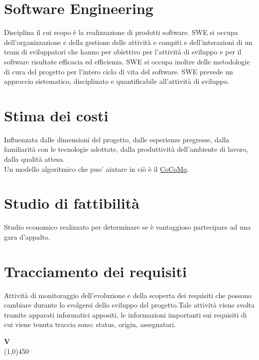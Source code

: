 	\section{Software Engineering}
	\label{sec:swe}
	Disciplina il cui scopo è la realizzazione di prodotti software.
	SWE si occupa dell'organizzazione e della gestione delle attività e compiti e dell'interazioni di un team di sviluppatori
	che hanno per obiettivo per l'attività di sviluppo e per il software risultate efficacia ed efficienza.	
	SWE si occupa inoltre delle metodologie di cura del progetto per l'intero ciclo di vita del software.
	SWE prevede un approccio sistematico, disciplinato e quantificabile all'attività di sviluppo.

	\section{Stima dei costi}
	\label{sec:stimacosti}
	Influenzata dalle dimensioni del progetto, dalle esperienze pregresse, dalla familiarità con le tecnologie adottate, dalla produttività dell'ambiente di lavoro, dalla qualità attesa. \\Un modello algoritmico che puo' aiutare in ciò è il \hyperref[sec:cocomo]{CoCoMo}.

	\section{Studio di fattibilità}
	\label{sec:studiofattibilita}
	Studio economico realizzato per determinare se è vantaggioso partecipare ad una gara d'appalto.\newpage

	\section{Tracciamento dei requisiti}
	\label{sec:tracciamentorequisiti}
	Attività di monitoraggio dell'evoluzione e della scoperta dei requisiti che possono cambiare durante lo svolgersi dello sviluppo del progetto.Tale attività viene svolta tramite apparati informatici appositi, le informazioni importanti sui requisiti di cui viene tenuta traccia sono: status, origin, assegnatari.\newpage

	{\Huge{\textbf{V}}} \\
	\line(1,0){450}
	
